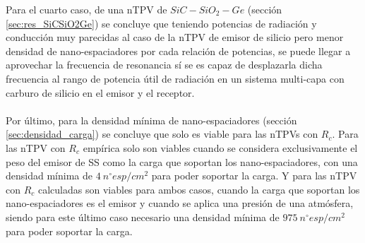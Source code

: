 Para el cuarto caso, de una nTPV de $SiC-SiO_2-Ge$ (sección \ref{sec:res_SiCSiO2Ge}) se concluye que teniendo potencias de radiación y conducción muy parecidas al caso de la nTPV de emisor de silicio pero menor densidad de nano-espaciadores por cada relación de potencias, se puede llegar a aprovechar la frecuencia de resonancia sí se es capaz de desplazarla dicha frecuencia al rango de potencia útil de radiación en un sistema multi-capa con carburo de silicio en el emisor y el receptor.\\\\
Por último, para la densidad mínima de nano-espaciadores (sección \ref{sec:densidad_carga}) se concluye que solo es viable para las nTPVs con $R_c$. Para las nTPV con $R_c$ empírica solo son viables cuando se considera exclusivamente el peso del emisor de SS como la carga que soportan los nano-espaciadores, con una densidad mínima de $4 \ n^{\circ}esp/cm^2$ para poder soportar la carga. Y para las nTPV con $R_c$ calculadas son viables para ambos casos, cuando la carga que soportan los nano-espaciadores es el emisor y cuando se aplica una presión de una atmósfera, siendo para este último caso necesario una densidad mínima de $975 \ n^{\circ}esp/cm^2$ para poder soportar la carga.\\\\
